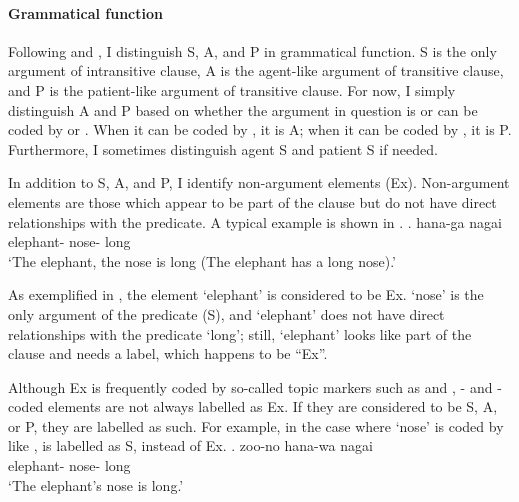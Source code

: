 \paragraph{Grammatical function}

Following  and ,
I distinguish S, A, and P in grammatical function.
S is the only argument of intransitive clause,
A is the agent-like argument of transitive clause,
and P is the patient-like argument of transitive clause.
For now, I simply distinguish A and P based on whether the argument in question is or can be coded by  or .
When it can be coded by , it is A;
when it can be coded by , it is P.
Furthermore, I sometimes distinguish agent S and patient S if needed.

In addition to S, A, and P,
I identify non-argument elements (Ex).\label{FW:Cor:TopFoc:ExDef}
Non-argument elements are those which appear to be part of the clause but do not have direct relationships with the predicate.
A typical example is shown in \Next.
%
\exg.  hana-ga nagai \\
		elephant- nose- long \\
		`The elephant, the nose is long (The elephant has a long nose).' \hfill{\cite{mikami60}}

As exemplified in \Last,
the element  `elephant' is considered to be Ex.
 `nose' is the only argument of the predicate (S),
and  `elephant' does not have direct relationships with the predicate  `long';
still,  `elephant' looks like part of the clause and needs a label,
which happens to be ``Ex''.

Although Ex is frequently coded by so-called topic markers
such as  and ,
- and -coded elements are not always labelled as Ex.
If they are considered to be S, A, or P,
they are labelled as such.
For example, in the case where  `nose' is coded by  like \Next,
 is labelled as S, instead of Ex.
%
\exg. zoo-no hana-wa nagai \\
      elephant- nose- long \\
      `The elephant's nose is long.'







